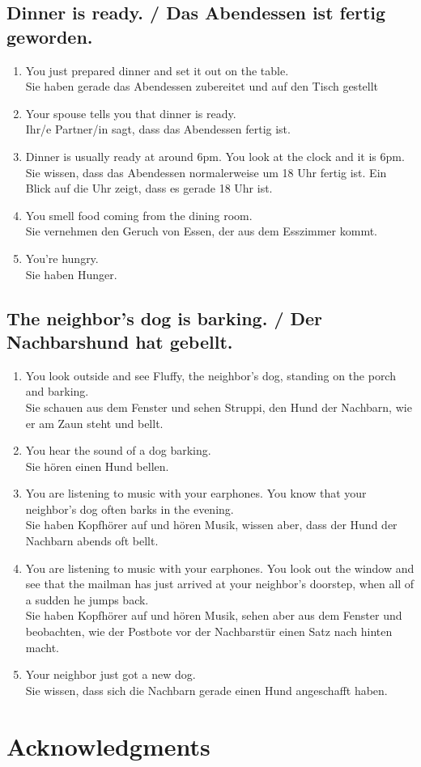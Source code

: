 \documentclass[11pt]{article}
\begin{document}
\subsection{Dinner is ready. / Das Abendessen ist fertig geworden.}

\begin{enumerate}
	\item You just prepared dinner and set it out on the table.\\
	Sie haben gerade das Abendessen zubereitet und auf den Tisch gestellt
	\item Your spouse tells you that dinner is ready.\\
	Ihr/e Partner/in sagt, dass das Abendessen fertig ist.
	\item Dinner is usually ready at around 6pm. You look at the clock and it is 6pm.\\
	Sie wissen, dass das Abendessen normalerweise um 18 Uhr fertig ist. Ein Blick auf die Uhr zeigt, dass es gerade 18 Uhr ist.
	\item You smell food coming from the dining room.\\
	Sie vernehmen den Geruch von Essen, der aus dem Esszimmer kommt.
	\item You're hungry.\\
	Sie haben Hunger.
\end{enumerate}

\subsection{The neighbor's dog is barking. / Der Nachbarshund hat gebellt.}

\begin{enumerate}
	\item You look outside and see Fluffy, the neighbor's dog, standing on the porch and barking.\\
	Sie schauen aus dem Fenster und sehen Struppi, den Hund der Nachbarn, wie er am Zaun steht und bellt.
	\item You hear the sound of a dog barking.\\
	Sie hören einen Hund bellen.
	\item You are listening to music with your earphones. You know that your neighbor's dog often barks in the evening.\\
	Sie haben Kopfhörer auf und hören Musik, wissen aber, dass der Hund der Nachbarn abends oft bellt.
	\item You are listening to music with your earphones. You look out the window and see that the mailman has just arrived at your neighbor's doorstep, when all of a sudden he jumps back.\\
	Sie haben Kopfhörer auf und hören Musik, sehen aber aus dem Fenster und beobachten, wie der Postbote vor der Nachbarstür einen Satz nach hinten macht.
	\item Your neighbor just got a new dog.\\
	Sie wissen, dass sich die Nachbarn gerade einen Hund angeschafft haben.
\end{enumerate}

\section{Acknowledgments}





\setlength{\bibleftmargin}{.125in}
\setlength{\bibindent}{-\bibleftmargin}


\end{document}
